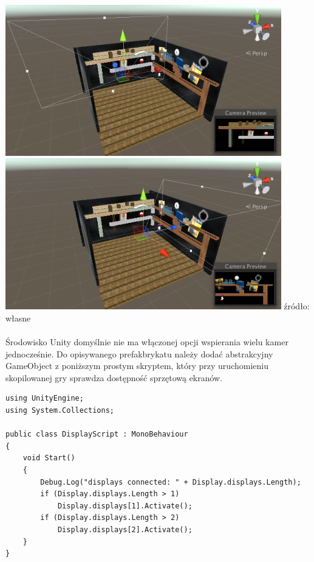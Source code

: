 \begin{center}
\includegraphics[width=0.9\textwidth]{images/kamera1.png}
\includegraphics[width=0.9\textwidth]{images/kamera2.png}
\small {źródło: własne }
\end{center}

\paragraph{}
Środowisko Unity domyślnie nie ma włączonej opcji wspierania wielu kamer jednocześnie. Do opisywanego prefakbrykatu należy dodać abstrakcyjny GameObject z poniższym prostym skryptem, który przy uruchomieniu skopilowanej gry sprawdza dostępność sprzętową ekranów.

\begin{lstlisting}[language=CSharp]
using UnityEngine;
using System.Collections;

public class DisplayScript : MonoBehaviour
{
	void Start()
	{
		Debug.Log("displays connected: " + Display.displays.Length);
		if (Display.displays.Length > 1)
			Display.displays[1].Activate();
		if (Display.displays.Length > 2)
			Display.displays[2].Activate();
	}
}
\end{lstlisting}

